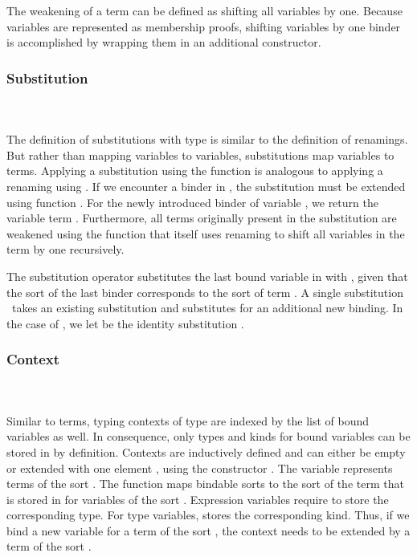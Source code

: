\noindent The weakening of a term can be defined as shifting all variables by one.
\Fowk 
Because variables are represented as membership proofs, shifting variables by one binder is accomplished by wrapping them in an additional  constructor.

\subsubsection{Substitution}\hfill\\\\
The definition of substitutions  with type    is similar to the definition of renamings. But rather than mapping variables to variables, substitutions map variables to terms.
\FoSub
Applying a substitution using the  function is analogous to applying a renaming using . If we encounter a binder in , the substitution must be extended using function .
\Foext
For the newly introduced binder of variable , we return the variable term .  
Furthermore, all terms originally present in the substitution  are weakened using the function  that itself uses renaming to shift all variables in the term by one recursively.

\noindent The substitution operator  \Data{[}  \Data{]} substitutes the last bound variable in  with , given that the sort of the last binder corresponds to the sort of term .
\Fsubs
A single substitution \Fsinglesub\ takes an existing substitution  and substitutes  for an additional new binding. In the case of \Data{\_[\_]}, we let  be the identity substitution \Fidsub.

\subsubsection{Context}\hfill\\\\
Similar to terms, typing contexts  of type   are indexed by the list of bound variables as well. In consequence, only types and kinds for bound variables can be stored in  by definition.
\FCtx
Contexts are inductively defined and can either be empty  or extended with one element , using the constructor   . The variable  represents terms of the sort  . 
\noindent The function  maps bindable sorts  to the sort of the term that is stored in  for variables of the sort .
\Fkind
Expression variables require  to store the corresponding type. 
For type variables,  stores the corresponding kind. Thus, if we bind a new variable for a term of the sort , the context  needs to be extended by a term of the sort  .

